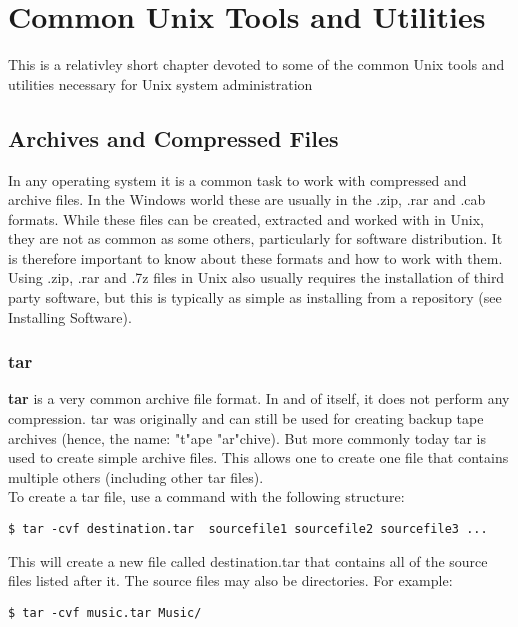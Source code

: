 \chapter{Common Unix Tools and Utilities}

This is a relativley short chapter devoted to some of the common Unix tools and utilities necessary for Unix system administration

\section{Archives and Compressed Files}

In any operating system it is a common task to work with compressed and archive files.  In the Windows world these are usually in the .zip, .rar and .cab formats.  While these files can be created, extracted and worked with in Unix, they are not as common as some others, particularly for software distribution.  It is therefore important to know about these formats and how to work with them.  Using .zip, .rar and .7z files in Unix also usually requires the installation of third party software, but this is typically as simple as installing from a repository (see Installing Software).

\subsection{tar}

\textbf{tar} is a very common archive file format.  In and of itself, it does not perform any compression.  tar was originally and can still be used for creating backup tape archives (hence, the name: "t"ape "ar"chive).  But more commonly today tar is used to create simple archive files.  This allows one to create one file that contains multiple others (including other tar files).\\

To create a tar file, use a command with the following structure:

\begin{verbatim}
$ tar -cvf destination.tar  sourcefile1 sourcefile2 sourcefile3 ...
\end{verbatim}

This will create a new file called destination.tar that contains all of the source files listed after it.  The source files may also be directories.  For example:

\begin{verbatim}
$ tar -cvf music.tar Music/
\end{verbatim}

